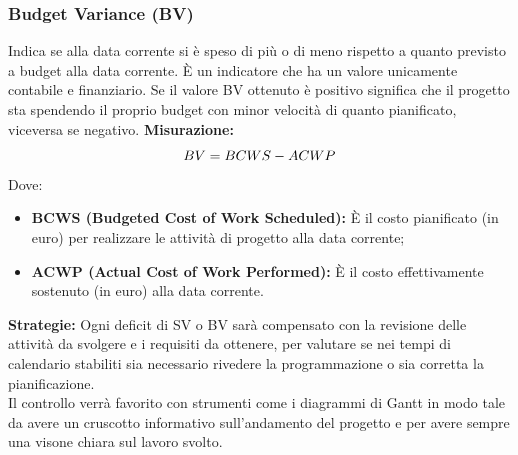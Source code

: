 	 	\subsubsection{Budget Variance (BV)} Indica se alla data corrente si è speso di più o di meno rispetto a quanto previsto
a budget alla data corrente.
	 	È un indicatore che ha un valore unicamente contabile e finanziario.
	 	Se il valore BV ottenuto è positivo significa che il progetto sta spendendo il proprio
budget con minor velocità di quanto pianificato, viceversa se negativo.\newline
	 	\textbf{Misurazione:}
\newline
	 	\[
	 		BV = BCWS-ACWP \newline
	 	\]
	 	Dove:
	 	\begin{itemize}
	 		\item \textbf{BCWS (Budgeted Cost of Work Scheduled):} È il costo pianificato (in euro) per realizzare le attività di progetto alla data corrente;

	 		\item \textbf{ACWP (Actual Cost of Work Performed):} È il costo effettivamente sostenuto (in euro) alla data corrente.
\newline
	 	\end{itemize}
	 	\textbf{Strategie:} Ogni deficit di SV o BV sarà compensato con la revisione delle attività da svolgere e i requisiti da ottenere, per valutare se nei tempi di calendario stabiliti sia necessario rivedere la programmazione o sia corretta la pianificazione.\\
	 	Il controllo verrà favorito con strumenti come i diagrammi di Gantt in modo tale da avere un cruscotto informativo sull'andamento del progetto e per avere sempre una visone chiara sul lavoro svolto.
